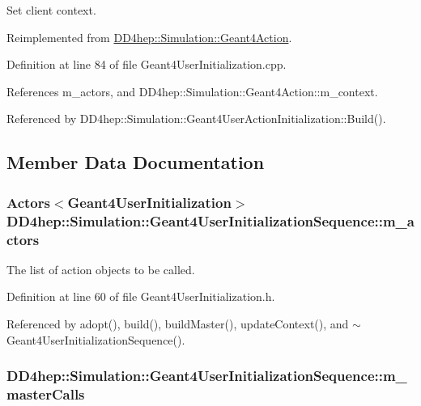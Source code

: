Set client context. 

Reimplemented from \hyperlink{class_d_d4hep_1_1_simulation_1_1_geant4_action_ae3b9daf2af881df956c46568c0743313}{DD4hep::Simulation::Geant4Action}.

Definition at line 84 of file Geant4UserInitialization.cpp.

References m\_\-actors, and DD4hep::Simulation::Geant4Action::m\_\-context.

Referenced by DD4hep::Simulation::Geant4UserActionInitialization::Build().

\subsection{Member Data Documentation}
\hypertarget{class_d_d4hep_1_1_simulation_1_1_geant4_user_initialization_sequence_a9239c0d702fcde97c6bc6387af30c09e}{
\subsubsection[{m\_\-actors}]{\setlength{\rightskip}{0pt plus 5cm}Actors$<${\bf Geant4UserInitialization}$>$ {\bf DD4hep::Simulation::Geant4UserInitializationSequence::m\_\-actors}}}
\label{class_d_d4hep_1_1_simulation_1_1_geant4_user_initialization_sequence_a9239c0d702fcde97c6bc6387af30c09e}


The list of action objects to be called. 

Definition at line 60 of file Geant4UserInitialization.h.

Referenced by adopt(), build(), buildMaster(), updateContext(), and $\sim$Geant4UserInitializationSequence().\hypertarget{class_d_d4hep_1_1_simulation_1_1_geant4_user_initialization_sequence_a3a7aa9cf5219734877b0ab71da54bb29}{
\subsubsection[{m\_\-masterCalls}]{ {\bf DD4hep::Simulation::Geant4UserInitializationSequence::m\_\-masterCalls}}}
\label{class_d_d4hep_1_1_simulation_1_1_geant4_user_initialization_sequence_a3a7aa9cf5219734877b0ab71da54bb29}


